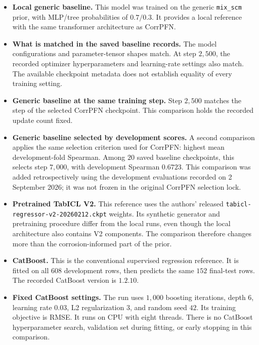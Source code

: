 \documentclass[11pt]{article}
\newenvironment{notes}
  {\begin{itemize}\setlength{\itemsep}{0.45em}\setlength{\parsep}{0pt}}
  {\end{itemize}}
\begin{document}
\begin{notes}
    \item \textbf{Local generic baseline.}
    This model was trained on the generic
    \texttt{mix\_scm} prior, with MLP/tree probabilities of
    \(0.7/0.3\). It provides a local reference with the same
    transformer architecture as CorrPFN.

    \item \textbf{What is matched in the saved baseline records.}
    The model configurations and parameter-tensor shapes
    match. At step \(2{,}500\), the recorded optimizer
    hyperparameters and learning-rate settings also match.
    The available checkpoint metadata does not establish
    equality of every training setting.

    \item \textbf{Generic baseline at the same training step.}
    Step \(2{,}500\) matches the step of the selected CorrPFN
    checkpoint. This comparison holds the recorded update
    count fixed.

    \item \textbf{Generic baseline selected by development scores.}
    A second comparison applies the same selection criterion
    used for CorrPFN: highest mean development-fold Spearman.
    Among \(20\) saved baseline checkpoints, this selects
    step \(7{,}000\), with development Spearman \(0.6723\).
    This comparison was added retrospectively using the
    development evaluations recorded on 2 September 2026;
    it was not frozen in the original CorrPFN selection lock.

    \item \textbf{Pretrained TabICL V2.}
    This reference uses the authors' released
    \texttt{tabicl-regressor-v2-20260212.ckpt} weights.
    Its synthetic generator and pretraining procedure differ
    from the local runs, even though the local architecture
    also contains V2 components.
    The comparison therefore changes more than the
    corrosion-informed part of the prior.

    \item \textbf{CatBoost.}
    This is the conventional supervised regression reference.
    It is fitted on all \(608\) development rows, then
    predicts the same \(152\) final-test rows.
    The recorded CatBoost version is \(1.2.10\).

    \item \textbf{Fixed CatBoost settings.}
    The run uses \(1{,}000\) boosting iterations, depth \(6\),
    learning rate \(0.03\), L2 regularization \(3\), and
    random seed \(42\). Its training objective is RMSE.
    It runs on CPU with eight threads.
    There is no CatBoost hyperparameter search, validation
    set during fitting, or early stopping in this comparison.


\end{notes}
\end{document}
